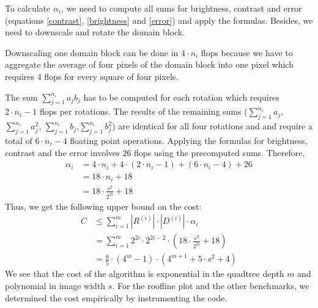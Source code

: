 To calculate $\alpha_{i}$, we need to compute all sums for brightness,
contrast and error (equations \eqref{contrast}, \eqref{brightness} and
\eqref{error}) and apply the formulas. Besides, we need to downscale and
rotate the domain block.

Downscaling one domain block can be done in $4\cdot n_{i}$ flops because we have
to aggregate the average of four pixels of the domain block into one pixel which
requires 4 flops for every square of four pixels.

The sum $\sum_{j=1}^{n_{i}} a_j b_j$ has to be computed for each rotation which
requires $2\cdot n_{i}-1$ flops per rotations. The results of the remaining sums
($\sum_{j=1}^{n_{i}} a_j$, $\sum_{j=1}^{n_{i}} a_j^2$,
$\sum_{j=1}^{n_{i}} b_j$,$\sum_{j=1}^{n_{i}} b_j^2$) are identical for all four
rotations and and require a total of $6\cdot n_{i}-4$ floating point operations.
Applying the formulas for brightness, contrast and the error involves $26$ flops
using the precomputed sums. Therefore,
\begin{align*}
  \alpha_i &= 4\cdot n_{i} + 4 \cdot (2\cdot n_{i}-1) + (6\cdot n_{i}-4) +  26\\
           &= 18\cdot n_{i} + 18 \\
           &= 18 \cdot \frac{s^2}{2^{2i}} + 18
\end{align*}
Thus, we get the following upper bound on the cost:
\begin{align*}
C &\leq \sum_{i=1}^m |R^{(i)}| \cdot |D^{(i)}| \cdot \alpha_i \\
  &= \sum_{i=1}^m 2^{2i} \cdot 2^{2i-2} \cdot (18 \cdot \frac{s^2}{2^{2i}} + 18) \\
  &= \frac{6}{5}\cdot (4^{m}-1)\cdot (4^{m+1} + 5\cdot s^{2} + 4)
\end{align*}
We see that the cost of the algorithm is exponential in the quadtree depth $m$
and polynomial in image width $s$. For the roofline plot and the other benchmarks,
we determined the cost empirically by instrumenting the code.

